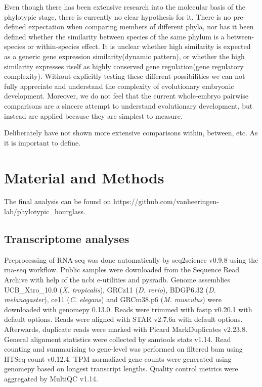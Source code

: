 Even though there has been extensive research into the molecular basis of the phylotypic stage, there is currently no clear hypothesis for it. There is no pre-defined expectation when comparing members of different phyla, nor has it been defined whether the similarity between species of the same phylum is a between-species or within-species effect. It is unclear whether high similarity is expected as a generic gene expression similarity(dynamic pattern), or whether the high similarity expresses itself as highly conserved gene regulation(gene regulatory complexity). Without explicitly testing these different possibilities we can not fully appreciate and understand the complexity of evolutionary embryonic development. Moreover, we do not feel that the current whole-embryo pairwise comparisons are a sincere attempt to understand evolutionary development, but instead are applied because they are simplest to measure. 

Deliberately have not shown more extensive comparisons within, between, etc. As it is important to define.

\section{Material and Methods}

The final analysis can be found on https://github.com/vanheeringen-lab/phylotypic\_hourglass.

\subsection{Transcriptome analyses}

Preprocessing of RNA-seq was done automatically by seq2science v0.9.8\cite{seq2science} using the rna-seq workflow. Public samples were downloaded from the Sequence Read Archive with help of the ncbi e-utilities and pysradb\cite{Choudhary2019}. Genome assemblies UCB\_Xtro\_10.0 (\textit{X. tropicalis}), GRCz11 (\textit{D. rerio}), BDGP6.32 (\textit{D. melanogaster}), ce11 (\textit{C. elegans}) and GRCm38.p6 (\textit{M. musculus}) were downloaded with genomepy 0.13.0\cite{Frlich2023}. Reads were trimmed with fastp v0.20.1\cite{Chen2018} with default options. Reads were aligned with STAR v2.7.6a\cite{Dobin2012} with default options. Afterwards, duplicate reads were marked with Picard MarkDuplicates v2.23.8\cite{picard}. General alignment statistics were collected by samtools stats v1.14\cite{Danecek2021}. Read counting and summarizing to gene-level was performed on filtered bam using HTSeq-count v0.12.4\cite{Anders2014}. TPM normalized gene counts were generated using genomepy based on longest transcript lengths. Quality control metrics were aggregated by MultiQC v1.14\cite{Ewels2016}. 

